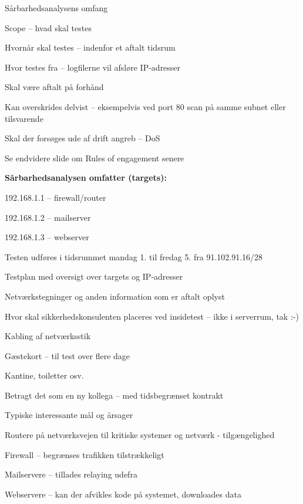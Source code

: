 \documentclass[20pt,landscape,a4paper,footrule]{foils}
\begin{document}
\begin{list1}
\item Sårbarhedsanalysens omfang
\begin{list2}
\item Scope -- hvad skal testes
\item Hvornår skal testes -- indenfor et aftalt tidsrum
\item Hvor testes fra -- logfilerne vil afsløre IP-adresser
\item Skal være aftalt på forhånd
\item Kan overskrides delvist -- eksempelvis ved port 80 scan på samme
  subnet eller tilsvarende
\item Skal der forsøges ude af drift angreb -- DoS
\item Se endvidere slide om Rules of engagement senere
\end{list2}
\item {\bf Sårbarhedsanalysen omfatter (targets):}
\begin{list2}
\item 192.168.1.1 -- firewall/router
\item 192.168.1.2 -- mailserver
\item 192.168.1.3 -- webserver
\item Testen udføres i tidsrummet mandag 1. til fredag 5. fra 91.102.91.16/28
\end{list2}
\end{list1}



\begin{list1}
\item Testplan med oversigt over targets og IP-adresser
\item Netværkstegninger og anden information som er aftalt oplyst
\item Hvor skal sikkerhedskonsulenten placeres ved insidetest -- ikke i serverrum, tak :-)
\item Kabling af netværksstik
\item Gæstekort -- til test over flere dage
\item Kantine, toiletter osv.
\end{list1}
\vskip 1cm
\centerline{Betragt det som en ny kollega -- med tidsbegrænset kontrakt}



\begin{list1}
\item Typiske interessante mål og årsager
\begin{list2}
\item Routere på netværksvejen til kritiske systemer og netværk -
  tilgængelighed
\item Firewall -- begrænses trafikken tilstrækkeligt
\item Mailservere -- tillades relaying udefra
\item Webservere -- kan der afvikles kode på systemet, downloades data
\end{list2}
\end{list1}
\end{document}
